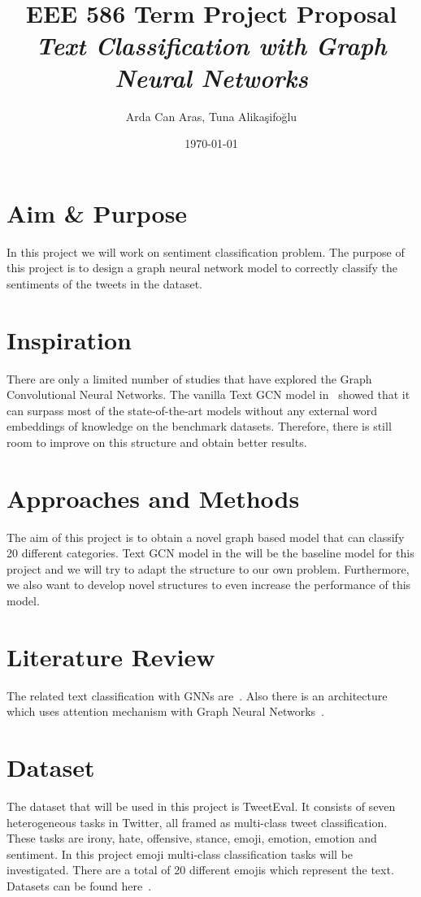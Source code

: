 \documentclass[a4paper, 12pt]{article}
\title{\textbf{EEE 586 Term Project Proposal}\\\Large \textit{Text Classification with Graph Neural Networks}}
\author{Arda Can Aras, Tuna Alikaşifoğlu}
\date{\today}
\begin{document}
    \maketitle

\section{Aim \& Purpose}
In this project we will work on sentiment classification problem. The purpose of this project is to design a graph neural network model to correctly classify the sentiments of the tweets in the dataset. 

\section{Inspiration}
There are only a limited number of studies that have explored the Graph Convolutional Neural Networks. The vanilla Text GCN model in~\autocite{yao2018graph} showed that it can surpass most of the state-of-the-art models without any external word embeddings of knowledge on the benchmark datasets. Therefore, there is still room to improve on this structure and obtain better results.

\section{Approaches and Methods}
The aim of this project is to obtain a novel graph based model that can classify 20 different categories. Text GCN model in the \cite{yao2018graph} will be the baseline model for this project and we will try to adapt the structure to our own problem. Furthermore, we also want to develop novel structures to even increase the performance of this model.

\section{Literature Review}
The related text classification with GNNs are~\autocite{yao2018graph,kipf2017semisupervised,peng2019hierarchical}. Also there is an architecture which uses attention mechanism with Graph Neural Networks~\autocite{velickovic2018graph}.

\section{Dataset}
The dataset that will be used in this project is TweetEval. It consists of seven heterogeneous tasks in Twitter, all framed as multi-class tweet classification. These tasks are irony, hate, offensive, stance, emoji, emotion, emotion and sentiment. In this project emoji multi-class classification tasks will be investigated. There are a total of 20 different emojis which represent the text. Datasets can be found here~\autocite{tweeteval}.
\end{document}

